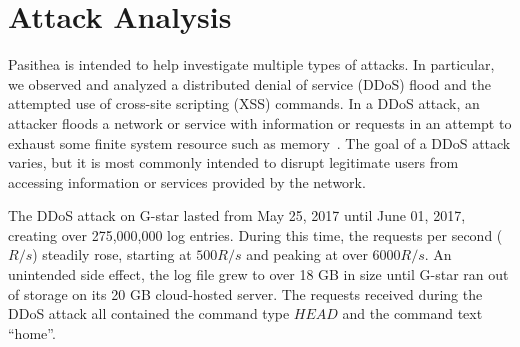 
\section{Attack Analysis} \label{analysis}

Pasithea is intended to help investigate multiple types of attacks.
In particular, we observed and analyzed a distributed denial of service (DDoS) flood and the attempted use of cross-site scripting (XSS) commands.
In a DDoS attack, an attacker floods a network or service with information or requests in an attempt to exhaust some finite system resource such as memory~\cite{DoS-Def}. 
The goal of a DDoS attack varies, but it is most commonly intended to disrupt legitimate users from accessing information or services provided by the network.

The DDoS attack on G-star lasted from May 25, 2017 until June 01, 2017, creating over 275,000,000 log entries. 
During this time, the requests per second ($R/s$) steadily rose, starting at $500 R/s$ and peaking at over $6000 R/s$. 
An unintended side effect, the log file grew to over 18 GB in size until G-star ran out of storage on its 20 GB cloud-hosted server.
The requests received during the DDoS attack all contained the command type $HEAD$ and the command text ``home''.

